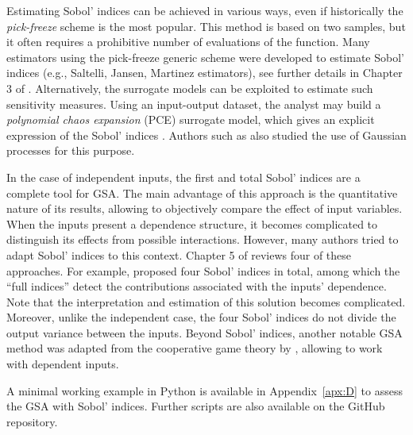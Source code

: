 Estimating Sobol' indices can be achieved in various ways, even if historically the \textit{pick-freeze} scheme is the most popular. 
This method is based on two samples, but it often requires a prohibitive number of evaluations of the function. 
Many estimators using the pick-freeze generic scheme were developed to estimate Sobol' indices (e.g., Saltelli, Jansen, Martinez estimators), see further details in Chapter 3 of \citet{daveiga_iooss_2021}. 
Alternatively, the surrogate models can be exploited to estimate such sensitivity measures. 
Using an input-output dataset, the analyst may build a \textit{polynomial chaos expansion} (PCE) surrogate model, which gives an explicit expression of the Sobol' indices \citep{sudret_2008}. 
Authors such as \citet{marrel_2009} also studied the use of Gaussian processes for this purpose. 
  
In the case of independent inputs, the first and total Sobol' indices are a complete tool for GSA. 
The main advantage of this approach is the quantitative nature of its results, allowing to objectively compare the effect of input variables. 
When the inputs present a dependence structure, it becomes complicated to distinguish its effects from possible interactions. 
However, many authors tried to adapt Sobol' indices to this context. 
Chapter 5 of \citet{daveiga_iooss_2021} reviews four of these approaches. 
For example, \citet{mara_tarantola_2012} proposed four Sobol' indices in total, among which the ``full indices'' detect the contributions associated with the inputs' dependence. 
Note that the interpretation and estimation of this solution becomes complicated. 
Moreover, unlike the independent case, the four Sobol' indices do not divide the output variance between the inputs. 
Beyond Sobol' indices, another notable GSA method was adapted from the cooperative game theory by \citet{owen_2014_shapley}, allowing to work with dependent inputs.   

\begin{otexample}
    A minimal working example in Python is available in Appendix~\ref{apx:D} to assess the GSA with Sobol' indices. 
    Further scripts are also available on the GitHub repository\footnotemark.  
\end{otexample}

